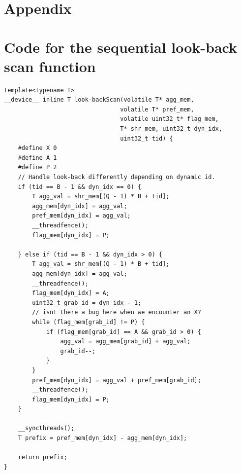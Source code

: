 \documentclass[twocolumn]{article}
\begin{document}
\newpage


\section{Appendix}

\appendix

\section{Code for the sequential look-back scan function}
\begin{lstlisting}[caption=look-back kernel,label=let:seqlook-backScan]
template<typename T>
__device__ inline T look-backScan(volatile T* agg_mem,
                                 volatile T* pref_mem,
                                 volatile uint32_t* flag_mem,
                                 T* shr_mem, uint32_t dyn_idx,
                                 uint32_t tid) {
    #define X 0
    #define A 1
    #define P 2
	// Handle look-back differently depending on dynamic id.
    if (tid == B - 1 && dyn_idx == 0) {
		T agg_val = shr_mem[(Q - 1) * B + tid];
		agg_mem[dyn_idx] = agg_val;
        pref_mem[dyn_idx] = agg_val;
        __threadfence();
        flag_mem[dyn_idx] = P;

    } else if (tid == B - 1 && dyn_idx > 0) {
		T agg_val = shr_mem[(Q - 1) * B + tid];
        agg_mem[dyn_idx] = agg_val;
        __threadfence();
        flag_mem[dyn_idx] = A;
        uint32_t grab_id = dyn_idx - 1;
        // isnt there a bug here when we encounter an X?
        while (flag_mem[grab_id] != P) {
            if (flag_mem[grab_id] == A && grab_id > 0) {
                agg_val = agg_mem[grab_id] + agg_val;
                grab_id--;
            }
        }
		pref_mem[dyn_idx] = agg_val + pref_mem[grab_id];
        __threadfence();
        flag_mem[dyn_idx] = P;
    }

	__syncthreads();
	T prefix = pref_mem[dyn_idx] - agg_mem[dyn_idx];

    return prefix;
}
\end{lstlisting}

\newpage
\end{document}
